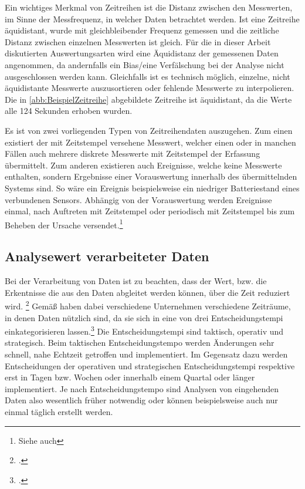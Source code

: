 Ein wichtiges Merkmal von Zeitreihen ist die Distanz zwischen den Messwerten, im Sinne der Messfrequenz, in welcher Daten betrachtet werden.  Ist eine Zeitreihe äquidistant, wurde mit gleichbleibender Frequenz gemessen und die zeitliche Distanz zwischen einzelnen Messwerten ist gleich. Für die in dieser Arbeit diskutierten Auswertungsarten wird eine Äquidistanz der gemessenen Daten angenommen, da andernfalls ein Bias/eine Verfälschung bei der Analyse nicht ausgeschlossen werden kann. Gleichfalls ist es technisch möglich, einzelne, nicht äquidistante Messwerte auszusortieren oder fehlende Messwerte zu interpolieren. Die in \autoref{abb:BeispielZeitreihe} abgebildete Zeitreihe ist äquidistant, da die Werte alle 124 Sekunden erhoben wurden.

Es ist von zwei vorliegenden Typen von Zeitreihendaten auszugehen. Zum einen existiert der mit Zeitstempel versehene Messwert, welcher einen oder in manchen Fällen auch mehrere diskrete Messwerte mit Zeitstempel der Erfassung übermittelt. 
Zum anderen existieren auch Ereignisse, welche keine Messwerte enthalten, sondern Ergebnisse einer Vorauswertung innerhalb des übermittelnden Systems sind. 
So wäre ein Ereignis beispielsweise ein niedriger Batteriestand eines verbundenen Sensors. 
Abhängig von der Vorauswertung werden Ereignisse einmal, nach Auftreten mit Zeitstempel oder periodisch mit Zeitstempel bis zum Beheben der Ursache versendet.\footnote{Siehe auch }

\subsection{Analysewert verarbeiteter Daten}

Bei der Verarbeitung von Daten ist zu beachten, dass der Wert, bzw. die Erkentnisse die aus den Daten abgleitet werden können, über die Zeit reduziert wird. \footcite[Vgl. auch im Folgenden][]{NucleusResarchInc..2012} Gemäß \citeauthor{NucleusResarchInc..2012} haben dabei verschiedene Unternehmen verschiedene Zeiträume, in denen Daten nützlich sind, da sie sich in eine von drei Entscheidungstempi einkategorisieren lassen.\footcite[Vgl. auch im Folgenden][3]{NucleusResarchInc..2012} Die Entscheidungstempi sind taktisch, operativ und strategisch. Beim taktischen Entscheidungstempo werden Änderungen sehr schnell, nahe Echtzeit getroffen und implementiert. Im Gegensatz dazu werden Entscheidungen der operativen und strategischen Entscheidungstempi respektive erst in Tagen bzw. Wochen oder innerhalb einem Quartal oder länger implementiert. Je nach Entscheidungstempo sind Analysen von eingehenden Daten also wesentlich früher notwendig oder können beispielsweise auch nur einmal täglich erstellt werden.

